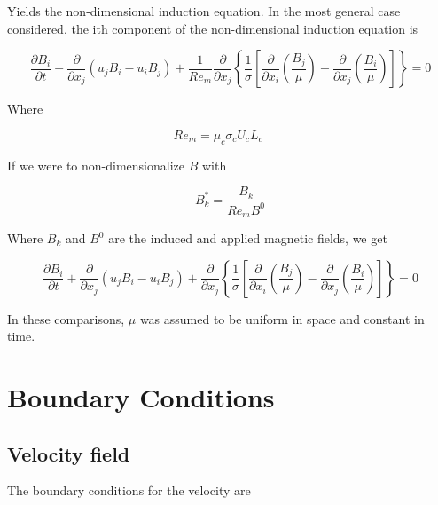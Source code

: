 \documentclass[11pt]{article}
\begin{document}
Yields the non-dimensional induction equation. In the most general case considered, the ith component of the non-dimensional induction equation is

\begin{equation}
	\frac{\partial B_i}{\partial t} 
	+ \frac{\partial}{\partial x_j} (u_j B_i - u_i B_j) 
	+ \frac{1}{Re_m}
	\frac{\partial}{\partial x_j} 
	\left\{ \frac{1}{\sigma} 
	\left[ 
	\frac{\partial}{\partial x_i} 
	\left( \frac{B_j}{\mu} \right) - 
	\frac{\partial}{\partial x_j} 
	\left( \frac{B_i}{\mu} \right)
	\right]
	\right\} = 0
\end{equation}

Where

\begin{equation}
	Re_m = \mu_c \sigma_c U_c L_c \qquad
\end{equation}

If we were to non-dimensionalize $B$ with

\begin{equation}
	B_k^* = \frac{B_k}{Re_m B^0}
\end{equation}

Where $B_k$ and $B^0$ are the induced and applied magnetic fields, we get

\begin{equation}
	\frac{\partial B_i}{\partial t} 
	+ \frac{\partial}{\partial x_j} (u_j B_i - u_i B_j) 
	+
	\frac{\partial}{\partial x_j} 
	\left\{ \frac{1}{\sigma} 
	\left[ 
	\frac{\partial}{\partial x_i} 
	\left( \frac{B_j}{\mu} \right) - 
	\frac{\partial}{\partial x_j} 
	\left( \frac{B_i}{\mu} \right)
	\right]
	\right\} = 0
\end{equation}


In these comparisons, $\mu$ was assumed to be uniform in space and constant in time.



\section{Boundary Conditions}

\subsection{Velocity field}
The boundary conditions for the velocity are 
\end{document}
